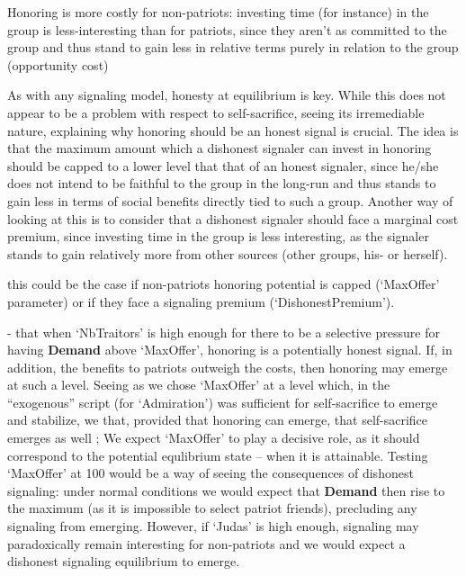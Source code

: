 \documentclass[a4paper,12pt]{report}
\begin{document}
Honoring is more costly for non-patriots: investing time (for instance)
in the group is less-interesting than for patriots, since they aren't as committed
to the group and thus stand to gain less in relative terms purely in relation to the group
(opportunity cost)


As with any signaling model, honesty at equilibrium is key.
While this does not appear to be a problem with respect to self-sacrifice,
seeing its irremediable nature, explaining why honoring should be an honest
signal is crucial. The idea is that the maximum amount which a dishonest
signaler can invest in honoring should be capped to a lower level that that
of an honest signaler, since he/she does not intend to be faithful to the
group in the long-run and thus stands to gain less in terms of social benefits
directly tied to such a group. 
Another way of looking at this is to consider
that a dishonest signaler should face a marginal cost premium, since investing
time in the group is less interesting, as the signaler stands to gain relatively
more from other sources (other groups, his- or herself).

this could be the case if non-patriots honoring potential is capped
(‘MaxOffer’ parameter) or if they face a signaling premium (‘DishonestPremium’).


- that when ‘NbTraitors’ is high enough for there to be a selective pressure for having \textbf{Demand} above ‘MaxOffer’, honoring is a potentially honest signal. If, in addition, the benefits to patriots outweigh the costs, then honoring may emerge at such a level. Seeing as we chose ‘MaxOffer’ at a level which, in the “exogenous” script (for ‘Admiration’) was sufficient for self-sacrifice to emerge and stabilize, we that, provided that honoring can emerge, that self-sacrifice emerges as well ;
We expect ‘MaxOffer’ to play a decisive role, as it should correspond to the potential equlibrium state – when it is attainable. Testing ‘MaxOffer’ at 100 would be a way of seeing the consequences of dishonest signaling: under normal conditions we would expect that \textbf{Demand} then rise to the maximum (as it is impossible to select patriot friends), precluding any signaling from emerging. However, if ‘Judas’ is high enough, signaling may paradoxically remain interesting for non-patriots and we would expect a dishonest signaling equilibrium to emerge.
\end{document}
